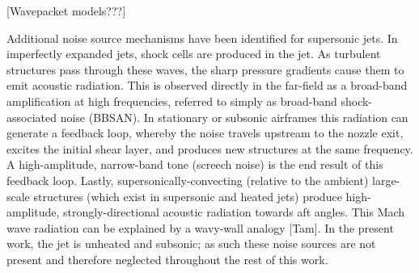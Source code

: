 [Wavepacket models???]
 
Additional noise source mechanisms have been identified for supersonic jets. In imperfectly expanded jets, shock cells are produced in the jet. As turbulent structures pass through these waves, the sharp pressure gradients cause them to emit acoustic radiation. 
This is observed directly in the far-field as a broad-band amplification at high frequencies, referred to simply as broad-band shock-associated noise (BBSAN). 
In stationary or subsonic airframes this radiation can generate a feedback loop, whereby the noise travels upstream to the nozzle exit, excites the initial shear layer, and produces new structures at the same frequency.
A high-amplitude, narrow-band tone (screech noise) is the end result of this feedback loop.
Lastly, supersonically-convecting (relative to the ambient) large-scale structures (which exist in supersonic and heated jets) produce high-amplitude, strongly-directional acoustic radiation towards aft angles.
This Mach wave radiation can be explained by a wavy-wall analogy [Tam].
In the present work, the jet is unheated and subsonic; as such these noise sources are not present and therefore neglected throughout the rest of this work.

 